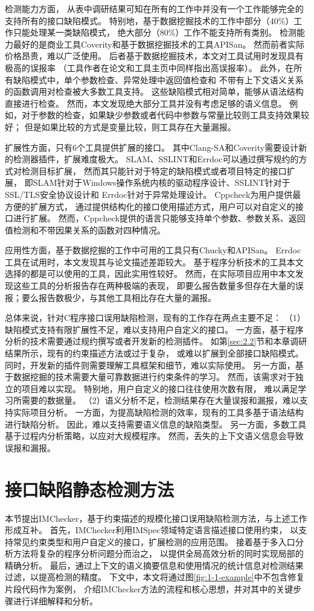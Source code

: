 检测能力方面，
从表中调研结果可知在所有的工作中并没有一个工作能够完全的支持所有的接口缺陷模式。
特别地，基于数据挖掘技术的工作中部分（40\%）工作只能处理某一类缺陷模式，
绝大部分（80\%）工作不能支持所有类别。
检测能力最好的是商业工具Coverity和基于数据挖掘技术的工具APISan。
然而前者实际价格昂贵，难以广泛使用。
后者基于数据挖掘技术，本文对工具试用时发现具有极高的误报率
（工具作者在论文和工具主页中同样指出高误报率）。
此外，在所有缺陷模式中，单个参数检查、异常处理中返回值检查和
不带有上下文语义关系的函数调用对检查被大多数工具支持。
这些缺陷模式相对简单，能够从语法结构直接进行检查。
然而，本文发现绝大部分工具并没有考虑足够的语义信息。
例如，对于参数的检查，如果缺少参数或者代码中参数与常量比较则工具支持效果较好；
但是如果比较的方式是变量比较，则工具存在大量漏报。

扩展性方面，只有6个工具提供扩展的接口。
其中Clang-SA和Coverity需要设计新的检测器插件，扩展难度极大。
SLAM、SSLINT和Errdoc可以通过撰写规约的方式对检测目标扩展，
然而其只能针对于特定的缺陷模式或者项目特定的接口扩展，
即SLAM针对于Windows操作系统内核的驱动程序设计、SSLINT针对于SSL/TLS安全协议设计和
Errdoc针对于异常处理设计。
Cppcheck为用户提供最方便的扩展方式，
通过提供结构化的接口使用描述方式，用户可以对自定义的接口进行扩展。
然而，Cppcheck提供的语言只能够支持单个参数、参数关系、返回值检测和不带因果关系的函数对四种情况。

应用性方面，基于数据挖掘的工作中可用的工具只有Chucky和APISan。
Errdoc工具在试用时，本文发现其与论文描述差距较大。
基于程序分析技术的工具本文选择的都是可以使用的工具，因此实用性较好。
然而，在实际项目应用中本文发现这些工具的分析报告存在两种极端的表现，
即要么报告数量多但存在大量的误报；要么报告数极少，与其他工具相比存在大量的漏报。

总体来说，针对C程序接口误用缺陷检测，现有的工作存在两点主要不足：
（1）缺陷模式支持有限扩展性不足，难以支持用户自定义的接口。
一方面，基于程序分析的技术需要通过规约撰写或者开发新的检测插件。
如第\ref{sec:2.2}节和本章调研结果所示，现有的约束描述方法或过于复杂，
或难以扩展到全部接口缺陷模式。
同时，开发新的插件则需要理解工具框架和细节，难以实际使用。
另一方面，基于数据挖掘的技术需要大量可靠数据进行约束条件的学习。
然而，该需求对于独立的项目难以实现。
特别地，用户自定义的接口往往使用次数有限，
难以满足学习所需要的数据量。
（2）语义分析不足，检测结果存在大量误报和漏报，难以支持实际项目分析。
一方面，为提高缺陷检测的效率，现有的工具多基于语法结构进行缺陷分析。
因此，难以支持需要语义信息的缺陷类型。
另一方面，多数工具基于过程内分析策略，以应对大规模程序。
然而，丢失的上下文语义信息会导致误报和漏报。

\section{接口缺陷静态检测方法}
\label{sec:3.3}
本节提出IMChecker，基于约束描述的规模化接口误用缺陷检测方法，与上述工作形成互补。
首先，IMChecker利用IMSpec领域特定语言描述接口使用约束，
以支持常见约束类型和用户自定义的接口，扩展检测的应用范围。
接着基于多入口分析方法将复杂的程序分析问题分而治之，
以提供全局高效分析的同时实现局部的精确分析。
最后，通过上下文的语义摘要信息和使用情况的统计信息对检测结果过滤，以提高检测的精度。
下文中，本文将通过图\ref{fig:1-1-example}中不包含修复片段代码作为案例，
介绍IMChecker方法的流程和核心思想，并对其中的关键步骤进行详细解释和分析。

